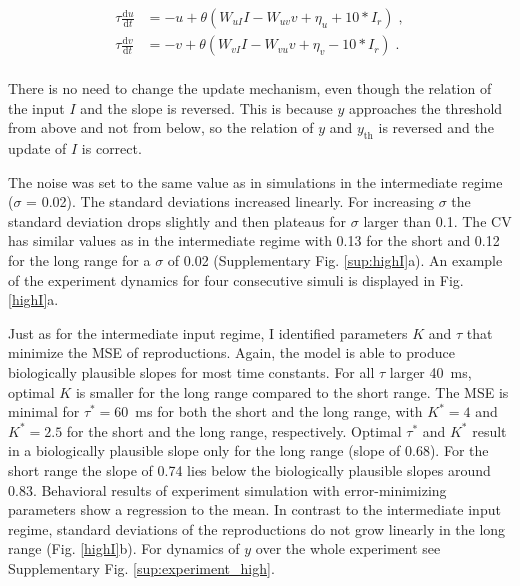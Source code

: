 \documentclass[10pt]{article}
\begin{document}
\begin{equation} \label{EqhighI}
	\begin{split}
	\tau\frac{\text{d}u}{\text{d}t} & = -u + \theta(W_{uI}I - W_{uv}v + \eta_u + 10*I_r) \;,\\
	\tau\frac{\text{d}v}{\text{d}t} & = -v + \theta(W_{vI}I - W_{vu}v + \eta_v - 10*I_r) \;.\\
	\end{split}
\end{equation}

There is no need to change the update mechanism, even though the relation of the input $I$ and the slope is reversed. This is because $y$ approaches the threshold from above and not from below, so the relation of $y$ and $y_{\text{th}}$ is reversed and the update of $I$ is correct. 

The noise was set to the same value as in simulations in the intermediate regime ($\sigma$ = 0.02). The standard deviations increased linearly. For increasing $\sigma$ the standard deviation drops slightly and then plateaus for $\sigma$ larger than 0.1. The CV has similar values as in the intermediate regime with 0.13 for the short and 0.12 for the long range for a $\sigma$ of 0.02 (Supplementary Fig. \ref{sup:highI}a). 
An example of the experiment dynamics for four consecutive simuli is displayed in Fig. \ref{highI}a.

Just as for the intermediate input regime, I identified parameters $K$ and $\tau$ that minimize the MSE of reproductions. 
Again, the model is able to produce biologically plausible slopes for most time constants. 
For all $\tau$ larger 40~ms, optimal $K$ is smaller for the long range compared to the short range.
The MSE is minimal for $\tau^* = 60$~ms for both the short and the long range, with $K^* = 4$ and $K^* = 2.5$  for the short and the long range, respectively. Optimal $\tau^*$ and $K^*$ result in a biologically plausible slope only for the long range (slope of 0.68). For the short range the slope of 0.74 lies below the biologically plausible slopes around 0.83.
Behavioral results of experiment simulation with error-minimizing parameters show a regression to the mean. In contrast to the intermediate input regime, standard deviations of the reproductions do not grow linearly in the long range (Fig. \ref{highI}b).
For dynamics of $y$ over the whole experiment see Supplementary Fig. \ref{sup:experiment_high}.
\end{document}
